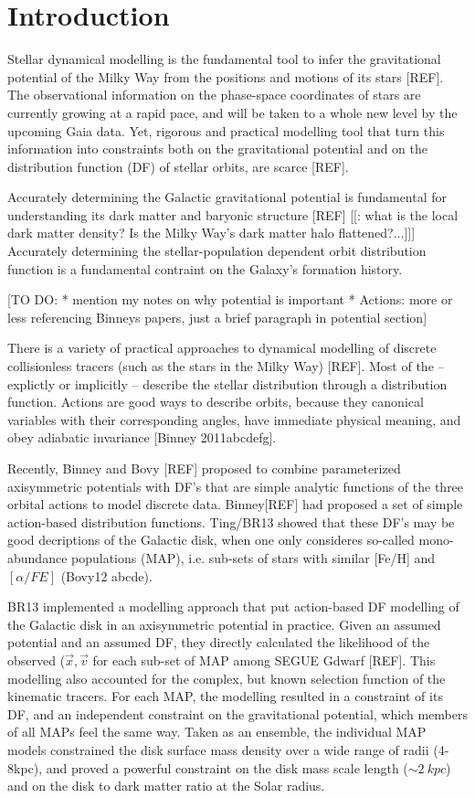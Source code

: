 \section{Introduction} \label{sec:intro}

Stellar dynamical modelling is the fundamental tool to infer the gravitational potential of the Milky Way from the positions and motions of its stars [REF]. The observational information on the phase-space coordinates of stars are currently growing at a rapid pace, and will be taken to a whole new level by the upcoming Gaia data. Yet, rigorous and practical modelling tool that turn this information into constraints both on the gravitational potential and on the distribution function (DF) of stellar orbits, are scarce [REF]. 

Accurately determining the Galactic gravitational potential is fundamental for understanding its dark matter and baryonic structure [REF] [[: what is the local dark matter density? Is the Milky Way's dark matter halo flattened?...]]] Accurately determining the stellar-population dependent orbit distribution function is a fundamental contraint on the Galaxy's formation history.

[TO DO: 
* mention my notes on why potential is important
* Actions: more or less referencing Binneys papers, just a brief paragraph in potential section]

There is a variety of practical approaches to dynamical modelling of discrete collisionless tracers (such as the stars in the Milky Way) [REF]. Most of the -- explictly or implicitly -- describe the stellar distribution through a distribution function.  Actions are good ways to describe orbits, because they canonical variables with their corresponding angles, have immediate physical meaning, and obey adiabatic invariance [Binney 2011abcdefg]. 

Recently, Binney and Bovy [REF] proposed to combine parameterized axisymmetric potentials with DF's that are simple analytic functions of the three orbital actions to model discrete data. Binney[REF] had proposed a set of simple action-based distribution functions. Ting/BR13 showed that these DF's
may be good decriptions of the Galactic disk, when one only consideres so-called mono-abundance populations (MAP), i.e. sub-sets of stars with similar [Fe/H] and $[\alpha/FE]$ (Bovy12 abcde).

BR13 implemented a modelling approach that put action-based DF modelling of the Galactic disk in an axisymmetric potential in practice. Given
an assumed potential and an assumed DF, they directly calculated the likelihood of the observed ($\vec{x},\vec{v}$ for each sub-set of MAP among SEGUE Gdwarf [REF]. This modelling also accounted for the complex, but known selection function of the kinematic tracers.  For each MAP, the modelling resulted in a constraint of its DF, and an independent constraint on the gravitational potential, which members of all MAPs feel the same way. 
Taken as an ensemble, the individual MAP models constrained the disk surface mass density over a wide range of radii (4-8kpc), and proved a powerful constraint on the disk mass scale length ($\sim 2~kpc$) and on the disk to dark matter ratio at the Solar radius. 

